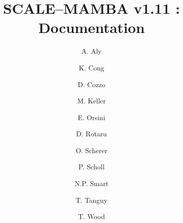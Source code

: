 \documentclass{article}
\begin{document}
\newcommand{\mainsection}[1]{\newpage \section{#1}}
\newcommand{\msubsection}[1]{\newpage \subsection{#1}}
\newcommand{\msubsubsection}[1]{\subsubsection{#1}}

\title{SCALE--MAMBA v1.11 : Documentation}
\author{
A. Aly
\and K. Cong
\and D. Cozzo
\and M. Keller 
\and E. Orsini
\and D. Rotaru 
\and O. Scherer
\and P. Scholl 
\and N.P. Smart
\and T. Tanguy
\and T. Wood}

\maketitle

\tableofcontents































\end{document}
